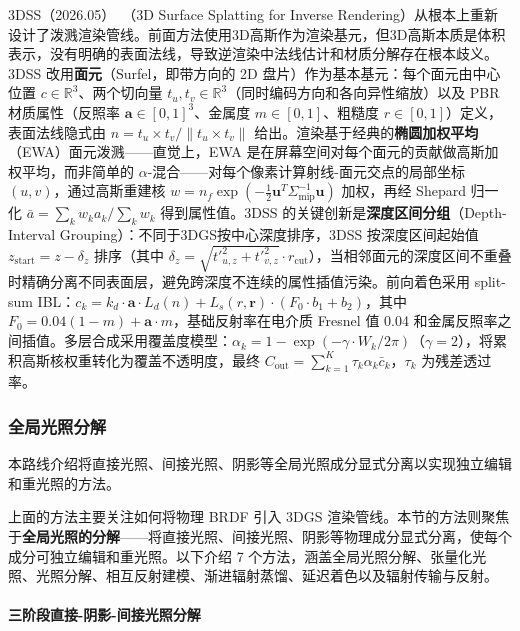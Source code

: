 3DSS（2026.05）~\cite{2605_05876}（3D Surface Splatting for Inverse Rendering）从根本上重新设计了泼溅渲染管线。前面方法使用3D高斯作为渲染基元，但3D高斯本质是体积表示，没有明确的表面法线，导致逆渲染中法线估计和材质分解存在根本歧义。3DSS 改用\textbf{面元}（Surfel，即带方向的 2D 盘片）作为基本基元：每个面元由中心位置 $c \in \mathbb{R}^3$、两个切向量 $t_u, t_v \in \mathbb{R}^3$（同时编码方向和各向异性缩放）以及 PBR 材质属性（反照率 $\boldsymbol{a} \in [0,1]^3$、金属度 $m \in [0,1]$、粗糙度 $r \in [0,1]$）定义，表面法线隐式由 $n = t_u \times t_v / \|t_u \times t_v\|$ 给出。渲染基于经典的\textbf{椭圆加权平均}（EWA）面元泼溅——直觉上，EWA 是在屏幕空间对每个面元的贡献做高斯加权平均，而非简单的 $\alpha$-混合——对每个像素计算射线-面元交点的局部坐标 $(u,v)$，通过高斯重建核 $w = n_f \exp(-\frac{1}{2} \boldsymbol{u}^T \Sigma_{\text{mip}}^{-1} \boldsymbol{u})$ 加权，再经 Shepard 归一化 $\bar{a} = \sum_k w_k a_k / \sum_k w_k$ 得到属性值。3DSS 的关键创新是\textbf{深度区间分组}（Depth-Interval Grouping）：不同于3DGS按中心深度排序，3DSS 按深度区间起始值 $z_{\text{start}} = z - \delta_z$ 排序（其中 $\delta_z = \sqrt{t'^2_{u,z} + t'^2_{v,z}} \cdot r_{\text{cut}}$），当相邻面元的深度区间不重叠时精确分离不同表面层，避免跨深度不连续的属性插值污染。前向着色采用 split-sum IBL：$c_k = k_d \cdot \boldsymbol{a} \cdot L_d(n) + L_s(r, \mathbf{r}) \cdot (F_0 \cdot b_1 + b_2)$，其中 $F_0 = 0.04(1-m) + \boldsymbol{a} \cdot m$，基础反射率在电介质 Fresnel 值 0.04 和金属反照率之间插值。多层合成采用覆盖度模型：$\alpha_k = 1 - \exp(-\gamma \cdot W_k / 2\pi)$（$\gamma=2$），将累积高斯核权重转化为覆盖不透明度，最终 $C_{\text{out}} = \sum_{k=1}^K \tau_k \alpha_k \bar{c}_k$，$\tau_k$ 为残差透过率。

\subsubsection{全局光照分解}

本路线介绍将直接光照、间接光照、阴影等全局光照成分显式分离以实现独立编辑和重光照的方法。

上面的方法主要关注如何将物理 BRDF 引入 3DGS 渲染管线。本节的方法则聚焦于\textbf{全局光照的分解}——将直接光照、间接光照、阴影等物理成分显式分离，使每个成分可独立编辑和重光照。以下介绍 7 个方法，涵盖全局光照分解、张量化光照、光照分解、相互反射建模、渐进辐射蒸馏、延迟着色以及辐射传输与反射。

\paragraph{三阶段直接-阴影-间接光照分解}

